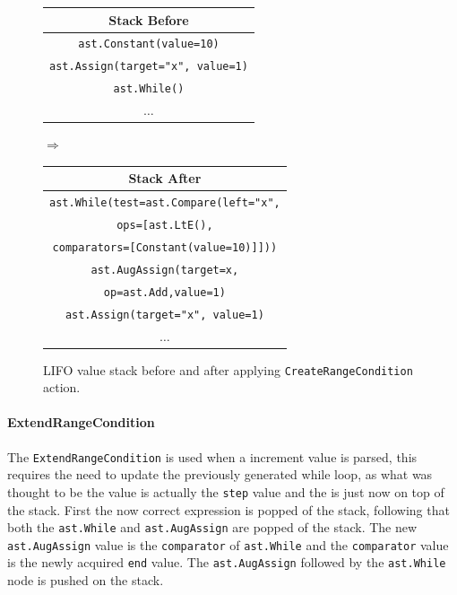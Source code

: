 \begin{figure}[H]\label{fig:createEmptyWhile-stack}
  \centering
  {\small
  \begin{tabular}{|c|}
    \hline
    \textbf{Stack Before} \\ \hline
    \texttt{\tiny{ast.}}\texttt{Constant(value=10)}\\ \hline
    \texttt{\tiny{ast.}}\texttt{Assign(target="x", value=1)}\\ \hline
    \texttt{\tiny{ast.}}\texttt{While()}\\ \hline
    \(\dots\)             \\ \hline
  \end{tabular}
  \hspace{0.25em}$\Longrightarrow$\hspace{0.25em}
  \begin{tabular}{|c|}
    \hline
    \textbf{Stack After} \\ \hline
    \texttt{\tiny{ast.}}\texttt{While(test=}\texttt{\tiny{ast.}}\texttt{Compare(left="x",}\\
    \texttt{ops=[ast.LtE(),}\\
    \texttt{comparators=[Constant(value=10)]]))}\\ \hline
    \texttt{\tiny{ast.}}\texttt{AugAssign(target=x,}\\ 
    \texttt{op=}\texttt{\tiny{ast.}}\texttt{Add,value=1)}\\ \hline
    \texttt{\tiny{ast.}}\texttt{Assign(target="x", value=1)}\\ \hline
    \(\dots\)                       \\ \hline
  \end{tabular}
  }
  \caption{LIFO value stack before and after applying \texttt{CreateRangeCondition} action.}
  
\end{figure}


\paragraph{ExtendRangeCondition}
The \texttt{ExtendRangeCondition} is used when a increment value is parsed, this requires the need to update the previously generated while loop, as what was thought to be the  value is actually the \texttt{step} value and the  is just now on top of the stack. First the now correct  expression is popped of the stack, following that both the \texttt{ast.While} and \texttt{ast.AugAssign} are popped of the stack. The new \texttt{ast.AugAssign} value is the \texttt{comparator} of \texttt{ast.While} and the \texttt{comparator} value is the newly acquired \texttt{end} value. The \texttt{ast.AugAssign} followed by the \texttt{ast.While} node is pushed on the stack. 



